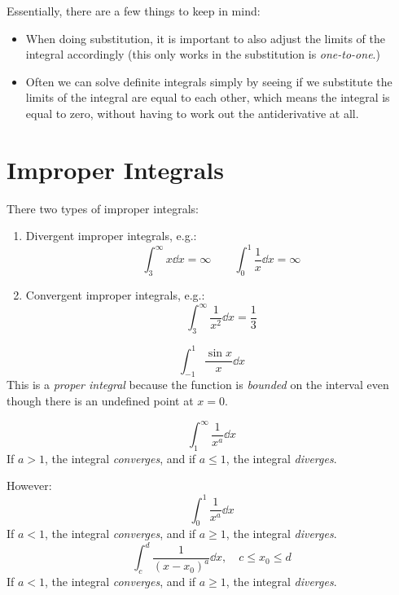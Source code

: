 \documentclass[00_complete]{subfiles}
\begin{document}
Essentially, there are a few things to keep in mind:
\begin{itemize}
    \item When doing substitution, it is important to also adjust the limits of
        the integral accordingly (this only works in the substitution is
        \emph{one-to-one}.)
    \item Often we can solve definite integrals simply by seeing if we
        substitute the limits of the integral are equal to each other, which
        means the integral is equal to zero, without having to work out the
        antiderivative at all.
\end{itemize}
\section{Improper Integrals}
There two types of improper integrals:
\begin{enumerate}
    \item Divergent improper integrals, e.g.:
        $$\int_{3}^{\infty}x\dd{x}=\infty \qquad
        \int_{0}^{1}\frac{1}{x}\dd{x}=\infty$$
    \item Convergent improper integrals, e.g.:
        $$\int_{3}^{\infty}\frac{1}{x^2}\dd{x}=\frac{1}{3}$$
\end{enumerate}
\begin{note}
    $$\int_{-1}^{1}\frac{\sin x}{x}\dd{x}$$
    This is a \emph{proper integral} because the function is \emph{bounded} on
    the interval even though there is an undefined point at $x=0$.
\end{note}
\begin{theorem}
$$\int_{1}^{\infty}\frac{1}{x^a}\dd{x}$$
If $a>1$, the integral \emph{converges}, and if $a\leq 1$, the integral
\emph{diverges}.

However:
$$\int_{0}^{1}\frac{1}{x^a}\dd{x}$$
If $a<1$, the integral \emph{converges}, and if $a\geq 1$, the integral
\emph{diverges}.
$$\int_{c}^{d}\frac{1}{(x-x_0)^a}\dd{x}, \quad c \leq x_0\leq d$$
If $a<1$, the integral \emph{converges}, and if $a\geq 1$, the integral
\emph{diverges}.
\end{theorem}
\end{document}
